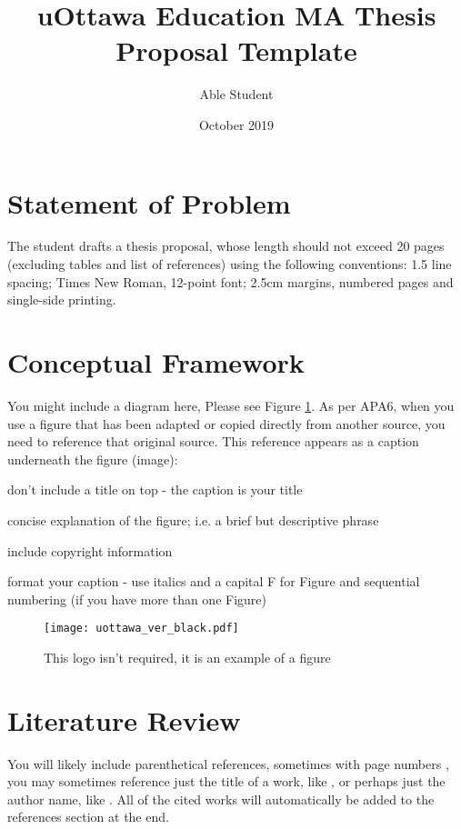 \documentclass[
doc, 
biblatex,
12pt
]{apa6}
\title{uOttawa Education MA Thesis Proposal Template}
\author{Able Student}
\date{October 2019}
\affiliation{University of Ottawa}
\begin{document}
\maketitle

\section{Statement of Problem}
The student drafts a thesis proposal, whose length should not exceed 20 pages (excluding tables and list of references) using the following conventions: 1.5 line spacing; Times New Roman, 12-point font; 2.5cm margins, numbered pages and single-side printing.

\lipsum[1]

\section{Conceptual Framework}
You might include a diagram here, Please see Figure \ref{fig:logo}. As per APA6, when you use a figure that has been adapted or copied directly from another source, you need to reference that original source. This reference appears as a caption underneath the figure (image):

\begin{APAitemize}
\item don't include a title on top - the caption is your title
\item concise explanation of the figure; i.e. a brief but descriptive phrase
\item include copyright information
\item format your caption - use italics and a capital F for Figure and sequential numbering (if you have more than one Figure)
\end{APAitemize}

\begin{figure}[!ht]
\centering
\texttt{[image: uottawa\_ver\_black.pdf]}
\caption{This logo isn't required, it is an example of a figure}
\label{fig:logo}
\end{figure}

\section{Literature Review}
You will likely include parenthetical references, sometimes with page numbers \parencite[p.\,12-14]{writer2109Best}, you may sometimes reference just the title of a work, like , or perhaps just the author name, like  \citeauthor{writer2109Best}. All of the cited works will automatically be added to the references section at the end.
\end{document}

